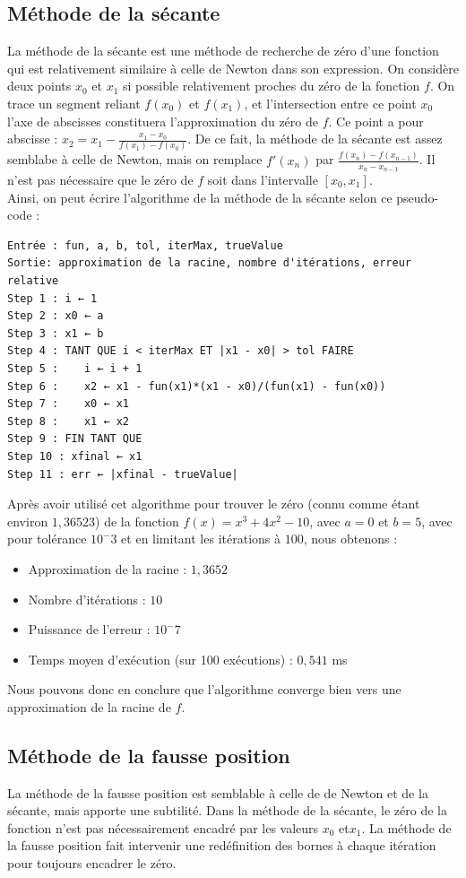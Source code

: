 \documentclass[12pt]{article}
\begin{document}
\subsection{Méthode de la sécante}
\label{ref:sécante}
\noindent La méthode de la sécante est une méthode de recherche de zéro d'une fonction qui est relativement similaire à celle de Newton dans son expression. On considère deux points $x_0$ et $x_1$ si possible relativement proches du zéro de la fonction $f$. On trace un segment reliant $f(x_0)$ et $f(x_1)$, et l'intersection entre ce point $x_0$ l'axe de abscisses constituera l'approximation du zéro de $f$. Ce point a pour abscisse : $x_2 = x_1 - \frac{x_1-x_0}{f(x_1)-f(x_0)}$. De ce fait, la méthode de la sécante est assez semblabe à celle de Newton, mais on remplace $f'(x_n)$ par $\frac{f(x_n)-f(x_{n-1})}{x_n-x_{n-1}}$. Il n'est pas nécessaire que le zéro de $f$ soit dans l'intervalle $[x_0,x_1]$. \\

\noindent Ainsi, on peut écrire l'algorithme de la méthode de la sécante selon ce pseudo-code :
\begin{verbatim}
Entrée : fun, a, b, tol, iterMax, trueValue
Sortie: approximation de la racine, nombre d'itérations, erreur relative
Step 1 : i ← 1
Step 2 : x0 ← a
Step 3 : x1 ← b
Step 4 : TANT QUE i < iterMax ET |x1 - x0| > tol FAIRE
Step 5 :    i ← i + 1
Step 6 :    x2 ← x1 - fun(x1)*(x1 - x0)/(fun(x1) - fun(x0))
Step 7 :    x0 ← x1
Step 8 :    x1 ← x2
Step 9 : FIN TANT QUE
Step 10 : xfinal ← x1
Step 11 : err ← |xfinal - trueValue|
\end{verbatim}
\noindent Après avoir utilisé cet algorithme pour trouver le zéro (connu comme étant environ $1,36523$) de la fonction $f(x) = x^3 + 4x^2 -10$, avec $a=0$ et $b=5$, avec pour tolérance $10^-3$ et en limitant les itérations à $100$, nous obtenons :
\begin{itemize}
    \item Approximation de la racine : $1,3652$
    \item Nombre d'itérations : $10$
    \item Puissance de l'erreur : $10^-7$
    \item Temps moyen d'exécution (sur 100 exécutions) : $0,541$ ms
\end{itemize}
Nous pouvons donc en conclure que l'algorithme converge bien vers une approximation de la racine de $f$.

\subsection{Méthode de la fausse position}
\label{ref:fausse-position}
\noindent La méthode de la fausse position est semblable à celle de de Newton et de la sécante, mais apporte une subtilité. Dans la méthode de la sécante, le zéro de la fonction n'est pas nécessairement encadré par les valeurs $x_0$ et$x_1$. La méthode de la fausse position fait intervenir une redéfinition des bornes à chaque itération pour toujours encadrer le zéro.\\
\end{document}
